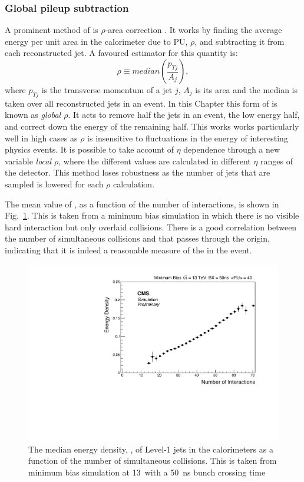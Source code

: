 \subsubsection{Global pileup subtraction}

A prominent method of \PUS is $\rho$-area correction
\cite{Cacciari:2007fd,Cacciari:2008gn}. It works by finding the
average energy per unit area in the calorimeter due to PU, $\rho$, and
subtracting it from each reconstructed jet. A favoured estimator for this
quantity is:
\begin{equation}
\rho\equiv median(\frac{p_{Tj}}{A_j}),
\end{equation}
where $p_{Tj}$ is the transverse momentum of a jet $j$, $A_j$ is its
area and the median is taken over all reconstructed jets in an event.
In this Chapter this form of \PUS is known as \emph{global $\rho$}. It
acts to remove half the jets in an event, the low energy half, and
correct down the energy of the remaining half. This works works
particularly well in high \PU cases as $\rho$ is insensitive to
fluctuations in the energy of interesting physics events. It is
possible to take account of $\eta$ dependence through a new variable
\emph{local $\rho$}, where the different values are calculated in
different $\eta$ ranges of the detector. This method loses robustness
as the number of jets that are sampled is lowered for each $\rho$
calculation.

The mean value of \rho, as a function of the number of interactions, is
shown in Fig.~\ref{fig:rho}. This is taken from a minimum bias \MC
simulation in which there is no visible hard interaction but only
overlaid \PU collisions. There is a good correlation between the
number of simultaneous collisions and \rho that passes through the
origin, indicating that it is indeed a reasonable measure of the \PU
in the event. 

\begin{figure}
	\begin{center}
		\includegraphics[width=0.8\linewidth]{figs/trigger/median}
  \caption{The median energy density, \rho, of Level-1 jets in the \CMS
  calorimeters as a function of the number of simultaneous collisions.
  This is taken from minimum bias \MC simulation at 13~\tev with a
  50~ns bunch crossing time}
	\end{center}
	\label{fig:rho}
\end{figure}

